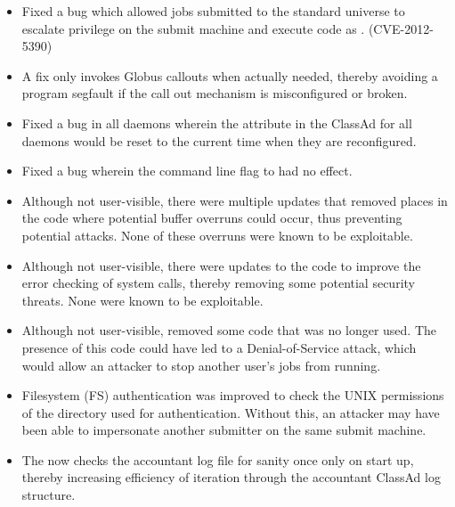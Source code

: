 \begin{itemize}

\item \Security Fixed a bug which allowed jobs submitted to the standard
universe to escalate privilege on the submit machine and execute code as 
.
(CVE-2012-5390)

\item A fix only invokes Globus callouts when actually needed, 
thereby avoiding a program segfault if
the call out mechanism is misconfigured or broken.

\item Fixed a bug in all daemons wherein the  attribute 
in the ClassAd for all daemons would be reset to the current time when they are
reconfigured.

\item Fixed a bug wherein the  command line flag
to  had no effect.

\item \Security Although not user-visible, 
there were multiple updates that removed places
in the code where potential buffer overruns could occur, 
thus preventing potential attacks.  
None of these overruns were known to be exploitable.

\item \Security Although not user-visible, 
there were updates to the code to improve
the error checking of system calls,
thereby removing some potential security threats.  
None were known to be exploitable.

\item \Security Although not user-visible, 
removed some code that was no longer used.
The presence of this code could have led to a Denial-of-Service attack,
which would allow an attacker to stop another user's jobs from running.

\item \Security Filesystem (FS) authentication was improved to check 
the UNIX permissions of the directory used for authentication.  
Without this, an attacker may have
been able to impersonate another submitter on the same submit machine.

\item The  now checks the accountant log file for sanity
once only on start up,  
thereby increasing efficiency of iteration through 
the accountant ClassAd log structure.


\end{itemize}
